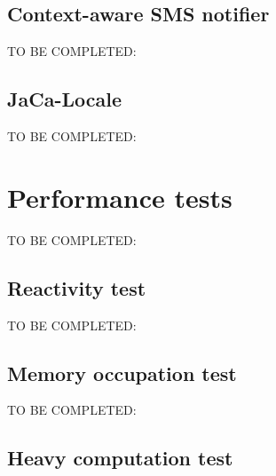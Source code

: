 \documentclass[11pt]{report}
\newcommand\tbc[1]{TO BE COMPLETED: \emph{#1}}
\begin{document}
\section{Context-aware SMS notifier}
\tbc{}
\section{JaCa-Locale}
\tbc{}
\chapter{Performance tests}
\tbc{}
\section{Reactivity test}
\tbc{}
\section{Memory occupation test}
\tbc{}
\section{Heavy computation test}



\end{document}
